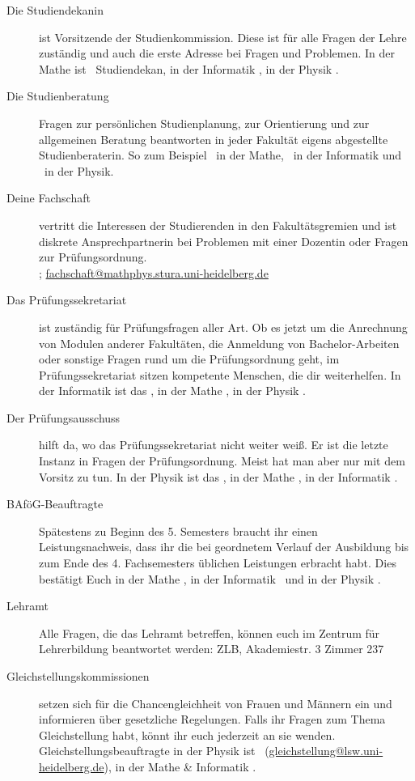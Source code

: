 \begin{description}
\item[Die Studiendekanin] ist Vorsitzende der Studienkommission. Diese ist für alle Fragen der Lehre zuständig und auch die erste Adresse bei Fragen und Problemen. In der Mathe ist \studiendekanmathe\ Studiendekan, in der Informatik \studiendekaninformatik , in der Physik \studiendekanphysik .

\item[Die Studienberatung] Fragen zur persönlichen Studienplanung, zur Orientierung und zur allgemeinen Beratung beantworten in jeder Fakultät eigens abgestellte Studienberaterin. So zum Beispiel \studienberatungmathe\ in der Mathe, \studienberatunginformatik\ in der Informatik und \studienberatungphysik\ in der Physik.

\item[Deine Fachschaft] vertritt die Interessen der Studierenden in den Fakultätsgremien und ist diskrete Ansprechpartnerin bei Problemen mit einer Dozentin oder Fragen zur Prüfungsordnung. \\\fsraum; \url{fachschaft@mathphys.stura.uni-heidelberg.de}

\item[Das Prüfungssekretariat] ist zuständig für Prüfungsfragen aller Art. Ob es jetzt um die Anrechnung von Modulen anderer Fakultäten, die Anmeldung von Bachelor-Arbeiten oder sonstige Fragen rund um die Prüfungsordnung geht, im Prüfungssekretariat sitzen kompetente Menschen, die dir weiterhelfen. In der Informatik ist das \pruefsekinfo, in der Mathe \pruefsekmathe, in der Physik \pruefsekphysik.

\item[Der Prüfungsausschuss] hilft da, wo das Prüfungssekretariat nicht weiter weiß. Er ist die letzte Instanz in Fragen der Prüfungsordnung. Meist hat man aber nur mit dem Vorsitz zu tun. In der Physik ist das \pruefausschussvorsitzphysik, in der Mathe \pruefausschussvorsitzmathe, in der Informatik \pruefausschussvorsitzinformatik.

\item[BAföG-Beauftragte] Spätestens zu Beginn des 5. Semesters braucht ihr einen Leistungsnachweis, dass ihr die bei geordnetem Verlauf der Ausbildung bis zum Ende des 4. Fachsemesters üblichen Leistungen erbracht habt. Dies bestätigt Euch in der Mathe \bafogmathe , in der Informatik \bafoginformatik\ und in der Physik \bafogphysik .

\item[Lehramt] Alle Fragen, die das Lehramt betreffen, können euch im Zentrum für Lehrerbildung beantwortet werden: ZLB, Akademiestr. 3 Zimmer 237

\item[Gleichstellungskommissionen] setzen sich für die Chancengleichheit von Frauen und Männern ein und informieren über gesetzliche Regelungen. Falls ihr Fragen zum Thema Gleichstellung habt, könnt ihr euch jederzeit an sie wenden. Gleichstellungsbeauftragte in der Physik ist \frauenbeauftragtephysik\ (\url{gleichstellung@lsw.uni-heidelberg.de}), in der Mathe \& Informatik \frauenbeauftragtemathe .

\end{description}

